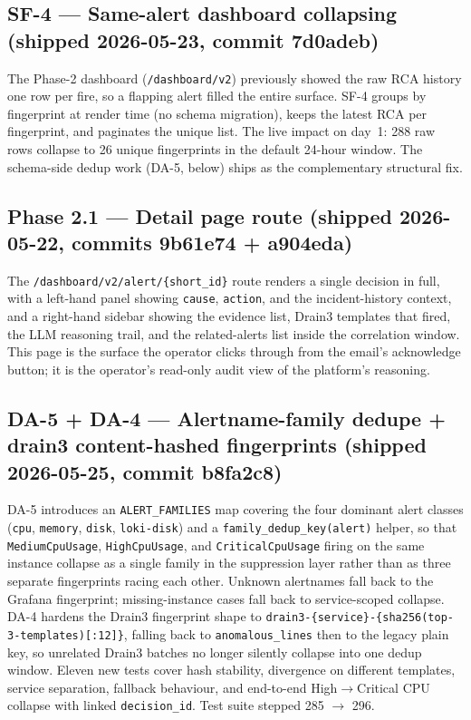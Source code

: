 \documentclass[11pt,a4paper,oneside]{report}
\begin{document}
\subsection{SF-4 --- Same-alert dashboard collapsing (shipped 2026-05-23, commit 7d0adeb)}

The Phase-2 dashboard (\texttt{/dashboard/v2}) previously showed
the raw RCA history one row per fire, so a flapping alert filled
the entire surface.  SF-4 groups by fingerprint at render time
(no schema migration), keeps the latest RCA per fingerprint, and
paginates the unique list.  The live impact on day~1: 288 raw
rows collapse to 26 unique fingerprints in the default 24-hour
window.  The schema-side dedup work (DA-5, below) ships as the
complementary structural fix.

\subsection{Phase 2.1 --- Detail page route (shipped 2026-05-22, commits 9b61e74 + a904eda)}

The \texttt{/dashboard/v2/alert/\{short\_id\}} route renders a
single decision in full, with a left-hand panel showing
\texttt{cause}, \texttt{action}, and the incident-history
context, and a right-hand sidebar showing the evidence list,
Drain3 templates that fired, the LLM reasoning trail, and the
related-alerts list inside the correlation window.  This page is
the surface the operator clicks through from the email's
acknowledge button; it is the operator's read-only audit view of
the platform's reasoning.

\subsection{DA-5 + DA-4 --- Alertname-family dedupe + drain3 content-hashed fingerprints (shipped 2026-05-25, commit b8fa2c8)}

DA-5 introduces an \texttt{ALERT\_FAMILIES} map covering the four
dominant alert classes (\texttt{cpu}, \texttt{memory},
\texttt{disk}, \texttt{loki-disk}) and a
\texttt{family\_dedup\_key(alert)} helper, so that
\texttt{MediumCpuUsage}, \texttt{HighCpuUsage}, and
\texttt{CriticalCpuUsage} firing on the same instance collapse
as a single family in the suppression layer rather than as three
separate fingerprints racing each other.  Unknown alertnames
fall back to the Grafana fingerprint; missing-instance cases
fall back to service-scoped collapse.  DA-4 hardens the Drain3
fingerprint shape to
\texttt{drain3-\{service\}-\{sha256(top-3-templates)[:12]\}},
falling back to \texttt{anomalous\_lines} then to the legacy
plain key, so unrelated Drain3 batches no longer silently
collapse into one dedup window.  Eleven new tests cover hash
stability, divergence on different templates, service separation,
fallback behaviour, and end-to-end High$\to$Critical CPU collapse
with linked \texttt{decision\_id}.  Test suite stepped 285 $\to$
296.
\end{document}
